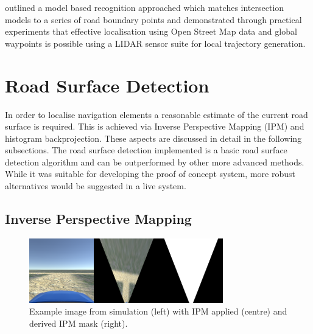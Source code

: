 \documentclass[]{aiaa-tc}%
\begin{document}
\citet{modelBasedIntersection} outlined a model based recognition approached which matches intersection models to a series of road boundary points and \citet{mitLocalNavDriving} demonstrated through practical experiments that effective localisation using Open Street Map data and global waypoints is possible using a LIDAR sensor suite for local trajectory generation.




\section{Road Surface Detection}\label{s:roadSurfaceDetection}

In order to localise navigation elements a reasonable estimate of the current road surface is required. This is achieved via Inverse Perspective Mapping (IPM) and histogram backprojection. These aspects are discussed in detail in the following subsections. The road surface detection implemented is a basic road surface detection algorithm and can be outperformed by other more advanced methods. While it was suitable for developing the proof of concept system, more robust alternatives would be suggested in a live system.

\subsection{Inverse Perspective Mapping}\label{s:ipm}

\begin{figure}
	\centering
	\includegraphics[width=0.75\textwidth]{RoadDetection/ipmSim.png}
	\caption{Example image from simulation (left) with IPM applied (centre) and derived IPM mask (right).}
	\label{f:ipmSim}
\end{figure}
\end{document}
